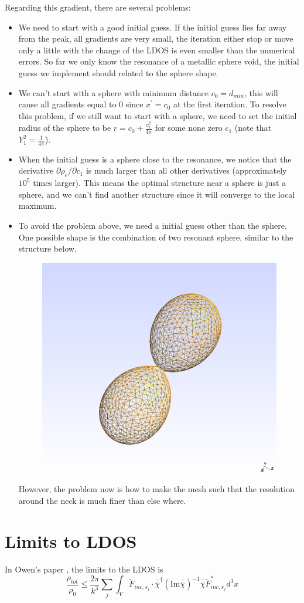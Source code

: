 \documentclass[12pt]{article}
\begin{document}
Regarding this gradient, there are several problems:
\begin{itemize}
\item We need to start with a good initial guess. If the initial guess lies far away from the peak, all gradients are very small, the iteration either stop or move only a little with the change of the LDOS is even smaller than the numerical errors. So far we only know the resonance of a metallic sphere void, the initial guess we implement should related to the sphere shape. 
\item We can't start with a sphere with minimum distance $c_0=d_{min}$, this will cause all gradients equal to 0 since $x^\prime=c_0$ at the first iteration. To resolve this problem, if we still want to start with a sphere, we need to set the initial radius of the sphere to be $r=c_0+\frac{c_1^2}{4\pi}$ for some none zero $c_1$ (note that $Y_1^2=\frac{1}{4\pi}$).
\item When the initial guess is a sphere close to the resonance, we notice that the derivative $\partial \rho_e/\partial c_1$ is much larger than all other derivatives (approximately $10^5$ times larger). This means the optimal structure near a sphere is just a sphere, and we can't find another structure since it will converge to the local maximum. 
\item To avoid the problem above, we need a initial guess other than the sphere. One possible shape is the combination of two resonant sphere, similar to the structure below.
\begin{figure}[H]
\centering
\includegraphics[width=0.45\linewidth]{TwoSphere.png}
\end{figure}
However, the problem now is how to make the mesh such that the resolution around the neck is much finer than else where.
\end{itemize}

\section{Limits to LDOS}
In Owen's paper \cite{main}, the limits to the LDOS is 
\begin{equation}
\frac{\rho_{tot}}{\rho_0} \leq \frac{2\pi}{k^3}\sum_j\int_V\tilde{F}_{inc,s_j}\cdot\overline{\overline{\chi}}^\dagger(\mathrm{Im}\overline{\overline{\chi}})^{-1}\overline{\overline{\chi}} \tilde{F}_{inc,s_j}^*d^3x
\end{equation}
\end{document}
